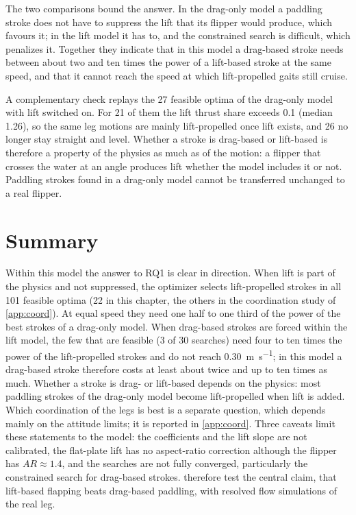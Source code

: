 The two comparisons bound the answer. In the drag-only model a paddling stroke does not have to suppress the lift that its
flipper would produce, which favours it; in the lift model it has to, and the constrained search is difficult, which penalizes
it. Together they indicate that in this model a drag-based stroke needs between about two and ten times the power of a
lift-based stroke at the same speed, and that it cannot reach the speed at which lift-propelled gaits still cruise.

A complementary check replays the 27 feasible optima of the drag-only model with lift switched on. For 21 of them the lift
thrust share exceeds 0.1 (median 1.26), so the same leg motions are mainly lift-propelled once lift exists, and 26 no longer
stay straight and level. Whether a stroke is drag-based or lift-based is therefore a property of the physics as much as of the
motion: a flipper that crosses the water at an angle produces lift whether the model includes it or not. Paddling strokes found
in a drag-only model cannot be transferred unchanged to a real flipper.

\section{Summary}
\label{sec:mj-summary}

Within this model the answer to RQ1 is clear in direction. When lift is part of the physics and not suppressed, the optimizer selects lift-propelled strokes in all 101 feasible optima (22 in this chapter, the others in the coordination study of \cref{app:coord}). At equal speed they need one half to one third of the
power of the best strokes of a drag-only model. When drag-based strokes are forced within the lift model, the few that are
feasible (3 of 30 searches) need four to ten times the power of the lift-propelled strokes and do not reach
\SI{0.30}{\metre\per\second}; in this model a drag-based stroke therefore costs at least about twice and up to ten times as much. Whether a stroke is drag- or lift-based depends on the physics:
most paddling strokes of the drag-only model become lift-propelled when lift is added. Which coordination of the legs is best
is a separate question, which depends mainly on the attitude limits; it is reported in \cref{app:coord}. Three caveats limit these statements to the model: the coefficients and the lift
slope are not calibrated, the flat-plate lift has no aspect-ratio correction although the flipper has
$\mathit{AR}\approx1.4$, and the searches are not fully converged, particularly the constrained search for drag-based strokes.  therefore test the
central claim, that lift-based flapping beats drag-based paddling, with resolved flow simulations of the real leg.
